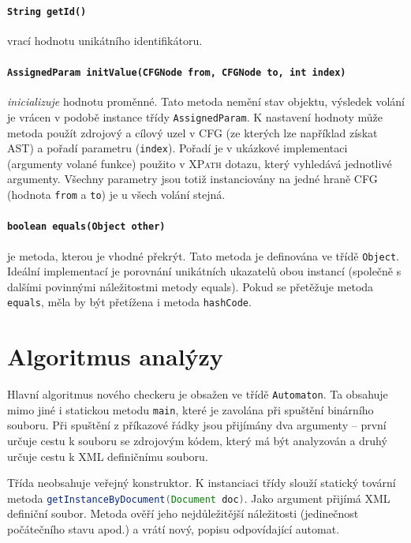 \documentclass[11pt,final,oneside]{fithesis}
\begin{document}
\paragraph{\texttt{String getId()}} vrací hodnotu unikátního identifikátoru. 

\paragraph{\texttt{AssignedParam initValue(CFGNode from, CFGNode to, int index)}} \emph{inicializuje} hodnotu proměnné. Tato metoda nemění stav objektu, výsledek volání je vrácen v podobě instance třídy {\tt AssignedParam}. K nastavení hodnoty může metoda použít zdrojový a cílový uzel v CFG (ze kterých lze například získat AST) a pořadí parametru ({\tt index}). Pořadí je v ukázkové implementaci (argumenty volané funkce) použito v \textsc{XPath} dotazu, který vyhledává jednotlivé argumenty. Všechny parametry jsou totiž instanciovány na jedné hraně CFG (hodnota {\tt from} a {\tt to}) je u všech volání stejná.

\paragraph{\texttt{boolean equals(Object other)}} je metoda, kterou je vhodné překrýt. Tato metoda je definována ve třídě {\tt Object}. Ideální implementací je porovnání unikátních ukazatelů obou instancí (společně s dalšími povinnými náležitostmi metody equals). Pokud se přetěžuje metoda {\tt equals}, měla by být přetížena i metoda {\tt hashCode}\cite{java-efektivne}.
   


\section{Algoritmus analýzy}
Hlavní algoritmus nového checkeru je obsažen ve třídě {\tt Automaton}. Ta obsahuje mimo jiné i statickou metodu {\tt main}, které je zavolána při spuštění binárního souboru. Při spuštění z příkazové řádky jsou přijímány dva argumenty -- první určuje cestu k souboru se zdrojovým kódem, který má být analyzován a druhý určuje cestu k XML definičnímu souboru.

Třída neobsahuje veřejný konstruktor. K instanciaci třídy slouží statický tovární metoda \lstinline[language=Java]{getInstanceByDocument(Document doc)}. Jako argument přijímá XML definiční soubor. Metoda ověří jeho nejdůležitější náležitosti (jedinečnost počátečního stavu apod.) a vrátí nový, popisu odpovídající automat.
\end{document}
